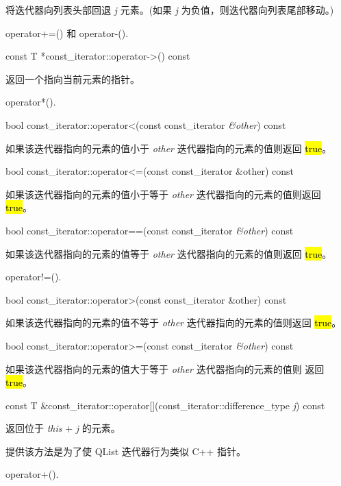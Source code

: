 将迭代器向列表头部回退 \emph{j} 元素。(如果 \emph{j} 为负值，则迭代器向列表尾部移动。)

\begin{seeAlso}
operator+=() 和 operator-().
\end{seeAlso}


const T *const\_iterator::operator->() const

返回一个指向当前元素的指针。

\begin{seeAlso}
operator*().
\end{seeAlso}


bool const\_iterator::operator<(const const\_iterator \emph{\&other}) const

如果该迭代器指向的元素的值小于 \emph{other} 迭代器指向的元素的值则返回 \hl{true}。

bool const\_iterator::operator<=(const const\_iterator \&other) const

如果该迭代器指向的元素的值小于等于 \emph{other} 迭代器指向的元素的值则返回
\hl{true}。

bool const\_iterator::operator==(const const\_iterator \emph{\&other}) const

如果该迭代器指向的元素的值等于 \emph{other} 迭代器指向的元素的值则返回 \hl{true}。

\begin{seeAlso}
operator!=().
\end{seeAlso}

bool const\_iterator::operator>(const const\_iterator \&other) const

如果该迭代器指向的元素的值不等于 \emph{other} 迭代器指向的元素的值则返回 \hl{true}。

bool const\_iterator::operator>=(const const\_iterator \emph{\&other}) const

如果该迭代器指向的元素的值大于等于 \emph{other} 迭代器指向的元素的值则
返回 \hl{true}。

const T \&const\_iterator::operator[](const\_iterator::difference\_type \emph{j}) const

返回位于 \emph{this} + \emph{j} 的元素。

提供该方法是为了使 QList 迭代器行为类似 C++ 指针。

\begin{seeAlso}
operator+().
\end{seeAlso}